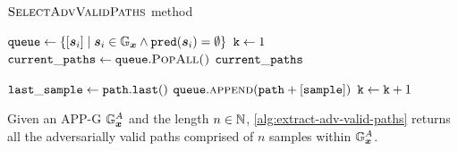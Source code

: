 \begin{algorithm}[H]
	\caption[$\algtitle{SelectAdvValidPaths}$ method]{$\algtitle{SelectAdvValidPaths}$ method}
	\label{alg:extract-adv-valid-paths}
	\begin{algorithmic}[1]
    \State $\mathtt{queue} \gets \{[\bm{s}_{i}] \mid \bm{s}_{i} \in \mathbb{G}_{\bm{x}}
    \wedge \boldsymbol{\mathtt{pred}}(\bm{s}_{i}) = \emptyset\}$
    \State $\mathtt{k} \gets 1$
      \State $\mathtt{current\_paths} \gets \mathtt{queue}.\textsc{PopAll()}$
          \State \Return $\mathtt{current\_paths}$
      \EndIf

        \State $\mathtt{last\_sample} \gets \mathtt{path.last()}$
            \State $\mathtt{queue}.\textsc{append}(\mathtt{path} + [\mathtt{sample}])$
          \EndIf
        \EndFor
      \EndFor
      \State $\mathtt{k} \gets \mathtt{k} + 1$
      \EndWhile
	\end{algorithmic}
\end{algorithm}
\iffalse
\fi
\begin{proposition}
\label{prop:extract-all-adv-valid-paths}
Given an \acs{APP-G} $\mathbb{G}^A_{\bm{x}}$ and the length $n \in \mathbb{N}$, \autoref{alg:extract-adv-valid-paths} returns all the adversarially valid paths comprised of $n$ samples within $\mathbb{G}^A_{\bm{x}}$.
\end{proposition}
